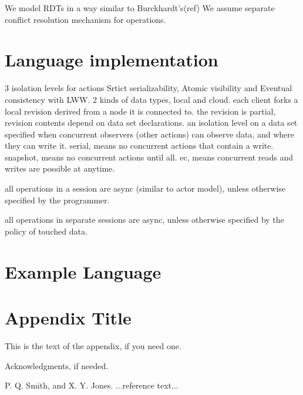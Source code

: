 \documentclass[preprint]{sigplanconf}
\begin{document}
We model RDTs in a way similar to Burckhardt's(ref)
We assume separate conflict resolution mechanism for operations.

\section{Language implementation}
3 isolation levels for actions Srtict serializability, Atomic visibility and
Eventual consistency with LWW. 
2 kinds of data types, local and cloud.
each client forks a local revision derived from a node it is connected to.
the revision is partial, revision contents depend on data set declarations.
an isolation level on a data set specified when concurrent observers (other actions)
can observe data, and where they can write it.
serial, means no concurrent actions that contain a write.
snapshot, means no concurrent actions until all.
ec, means concurrent reads and writes are possible at anytime.

all operations in a session are async (similar to actor model), unless otherwise
specified by the programmer.

all operations in separate sessions are async, unless otherwise specified by the
policy of touched data.

\section{Example Language}
\appendix
\section{Appendix Title}

This is the text of the appendix, if you need one.

\acks

Acknowledgments, if needed.





\begin{thebibliography}{}
\softraggedright

P. Q. Smith, and X. Y. Jones. ...reference text...

\end{thebibliography}
\end{document}
